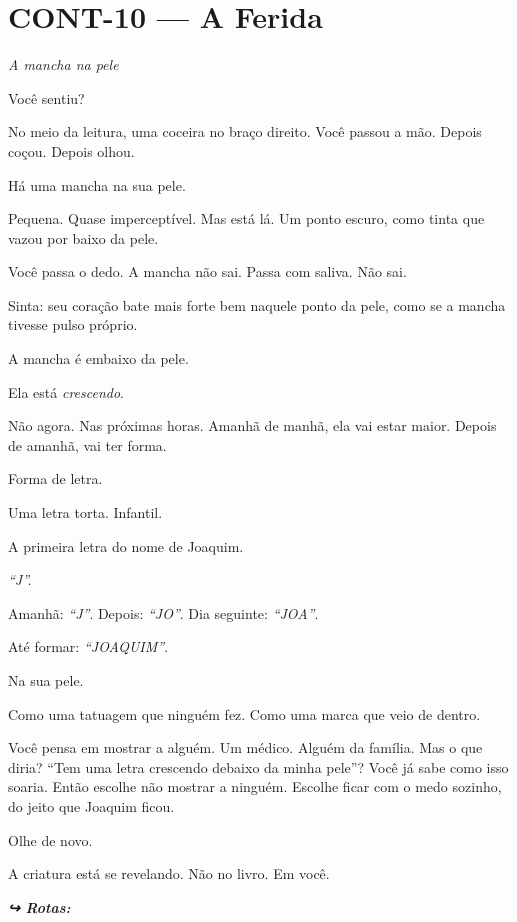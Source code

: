 \section*{\textbf{CONT-10} --- A Ferida}

\noindent \textit{A mancha na pele}

\noindent Você sentiu?

\noindent No meio da leitura, uma coceira no braço direito. Você passou a mão. Depois coçou. Depois olhou.

\noindent Há uma mancha na sua pele.

\noindent Pequena. Quase imperceptível. Mas está lá. Um ponto escuro, como tinta que vazou por baixo da pele.

\noindent Você passa o dedo. A mancha não sai. Passa com saliva. Não sai.

\noindent Sinta: seu coração bate mais forte bem naquele ponto da pele, como se a mancha tivesse pulso próprio.

\noindent A mancha é embaixo da pele.

\noindent Ela está \textit{crescendo}.

\noindent Não agora. Nas próximas horas. Amanhã de manhã, ela vai estar maior. Depois de amanhã, vai ter forma.

\noindent Forma de letra.

\noindent Uma letra torta. Infantil.

\noindent A primeira letra do nome de Joaquim.

\noindent \textit{\textquotedblleft{}J\textquotedblright{}.}

\noindent Amanhã: \textit{\textquotedblleft{}J\textquotedblright{}}.
Depois: \textit{\textquotedblleft{}JO\textquotedblright{}}.
Dia seguinte: \textit{\textquotedblleft{}JOA\textquotedblright{}}.

\noindent Até formar: \textit{\textquotedblleft{}JOAQUIM\textquotedblright{}}.

\noindent Na sua pele.

\noindent Como uma tatuagem que ninguém fez.
Como uma marca que veio de dentro.

\noindent Você pensa em mostrar a alguém. Um médico. Alguém da família. Mas o que diria? \textquotedblleft{}Tem uma letra crescendo debaixo da minha pele\textquotedblright{}? Você já sabe como isso soaria. Então escolhe não mostrar a ninguém. Escolhe ficar com o medo sozinho, do jeito que Joaquim ficou.

\noindent Olhe de novo.

\noindent A criatura está se revelando.
Não no livro.
Em você.

\vspace{0.5em}

\noindent\textit{\textbf{↪ Rotas:}  \rotasep {}}